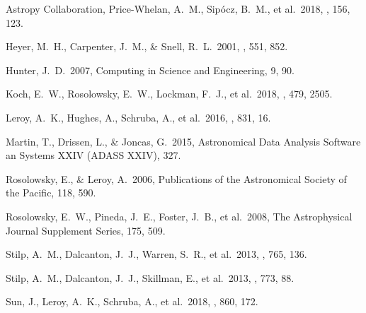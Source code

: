 \documentclass{rnaastex}
\begin{document}
\begin{thebibliography}{}


 Astropy Collaboration, Price-Whelan, A.~M., Sip{\'{o}}cz, B.~M., et al.\ 2018, \aj, 156, 123.

 Heyer, M.~H., Carpenter, J.~M., \& Snell, R.~L.\ 2001, \apj, 551, 852.

 Hunter, J.~D.\ 2007, Computing in Science and Engineering, 9, 90.

 Koch, E.~W., Rosolowsky, E.~W., Lockman, F.~J., et al.\ 2018, \mnras, 479, 2505.

 Leroy, A.~K., Hughes, A., Schruba, A., et al.\ 2016, \apj, 831, 16.

 Martin, T., Drissen, L., \& Joncas, G.\ 2015, Astronomical Data Analysis Software an Systems XXIV (ADASS XXIV), 327.

 Rosolowsky, E., \& Leroy, A.\ 2006, Publications of the Astronomical Society of the Pacific, 118, 590.

 Rosolowsky, E.~W., Pineda, J.~E., Foster, J.~B., et al.\ 2008, The Astrophysical Journal Supplement Series, 175, 509.

 Stilp, A.~M., Dalcanton, J.~J., Warren, S.~R., et al.\ 2013, \apj, 765, 136.

 Stilp, A.~M., Dalcanton, J.~J., Skillman, E., et al.\ 2013, \apj, 773, 88.

 Sun, J., Leroy, A.~K., Schruba, A., et al.\ 2018, \apj, 860, 172.


\end{thebibliography}
\end{document}
